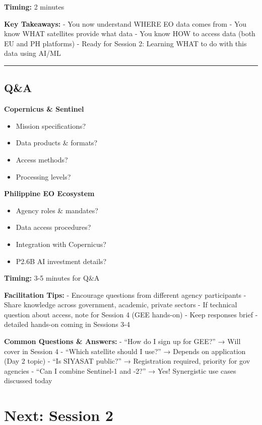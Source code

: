 \documentclass[
  letterpaper,
  DIV=11,
  numbers=noendperiod]{scrartcl}
\providecommand{\tightlist}{%
  \setlength{\itemsep}{0pt}\setlength{\parskip}{0pt}}
\begin{document}
\textbf{Timing:} 2 minutes

\textbf{Key Takeaways:} - You now understand WHERE EO data comes from -
You know WHAT satellites provide what data - You know HOW to access data
(both EU and PH platforms) - Ready for Session 2: Learning WHAT to do
with this data using AI/ML

\begin{center}\rule{0.5\linewidth}{0.5pt}\end{center}

\subsection{Q\&A}\label{qa}

\textbf{Copernicus \& Sentinel}

\begin{itemize}
\tightlist
\item
  Mission specifications?
\item
  Data products \& formats?
\item
  Access methods?
\item
  Processing levels?
\end{itemize}

\textbf{Philippine EO Ecosystem}

\begin{itemize}
\tightlist
\item
  Agency roles \& mandates?
\item
  Data access procedures?
\item
  Integration with Copernicus?
\item
  P2.6B AI investment details?
\end{itemize}

\textbf{Timing:} 3-5 minutes for Q\&A

\textbf{Facilitation Tips:} - Encourage questions from different agency
participants - Share knowledge across government, academic, private
sectors - If technical question about access, note for Session 4 (GEE
hands-on) - Keep responses brief - detailed hands-on coming in Sessions
3-4

\textbf{Common Questions \& Answers:} - ``How do I sign up for GEE?'' →
Will cover in Session 4 - ``Which satellite should I use?'' → Depends on
application (Day 2 topic) - ``Is SIYASAT public?'' → Registration
required, priority for gov agencies - ``Can I combine Sentinel-1 and
-2?'' → Yes! Synergistic use cases discussed today

\section{Next: Session 2}\label{next-session-2}
\end{document}
